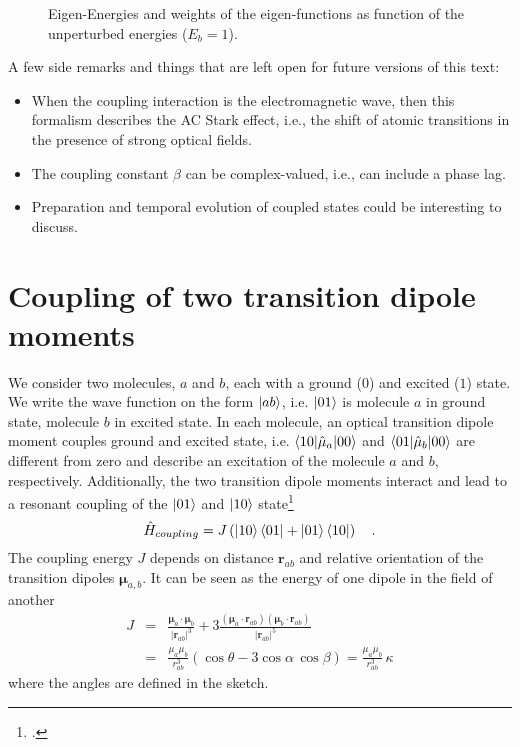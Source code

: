\begin{figure}

\caption{Eigen-Energies and weights of the eigen-functions as function of the unperturbed energies ($E_b = 1$).}
\end{figure}

A few side remarks and things that are left open for future versions of this text: 
\begin{itemize} \setlength{\itemsep}{0pt}
    \item When the coupling interaction is the electromagnetic wave, then this formalism describes the AC Stark effect, i.e., the shift of atomic transitions in the presence of strong optical fields.
    \item The coupling constant $\beta$ can be complex-valued, i.e., can include a phase lag.
    \item Preparation and temporal evolution of coupled states could be interesting to discuss.
\end{itemize}




\section{Coupling of two transition dipole moments}


We consider two molecules, $a$ and $b$, each with a ground ($0$) and excited ($1$) state. We write the wave function on the form $\ket{ab}$, i.e. $\ket{01}$ is molecule $a$ in ground state, molecule $b$ in excited state. In each molecule, an optical transition dipole moment couples ground and excited state, i.e. $\braket{10| \hat{\mu}_a | 00}$ and $\braket{01| \hat{\mu}_b | 00}$ are different from zero and describe an excitation of the molecule  $a$ and $b$, respectively. Additionally, the two transition dipole moments interact and lead to a resonant coupling of the 
$\ket{01}$ and $\ket{10}$ state\footcite{knoester-book}
\begin{equation}
\hat{H}_{coupling} = J \left(  \ket{10}\bra{01} + \ket{01}\bra{10}   \right) \quad .
\end{equation}
The coupling energy $J$ depends on distance $\boldsymbol{r}_{ab}$ and relative orientation of the transition dipoles $\boldsymbol{\mu}_{a,b}$. It can be seen as the energy of one dipole in the field of another
\begin{eqnarray}
 J & = & \frac{\boldsymbol{\mu}_a \cdot  \boldsymbol{\mu}_b }{|\boldsymbol{r}_{ab}|^3} 
  + 3 \frac{ (\boldsymbol{\mu}_a \cdot  \boldsymbol{r}_{ab})  (\boldsymbol{\mu}_b \cdot  \boldsymbol{r}_{ab})
  }{ |\boldsymbol{r}_{ab}|^5 } \\
   & = & \frac{\mu_a \mu_b }{r_{ab}^3} \left( \cos \theta - 3 \cos \alpha \, \cos \beta \right)  = \frac{\mu_a \mu_b }{r_{ab}^3} \, \kappa  
\end{eqnarray}
where the angles are defined in the sketch.

